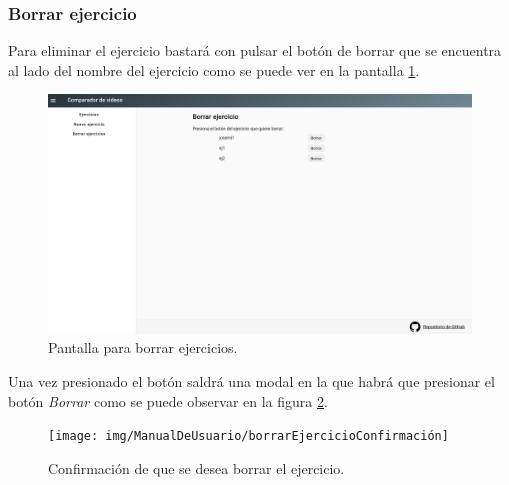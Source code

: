\subsubsection{Borrar ejercicio}
Para eliminar el ejercicio bastará con pulsar el botón de borrar que se encuentra al lado del nombre del ejercicio como se puede ver en la pantalla \ref{fig:borrarejercicio}.
\begin{figure}
	\centering
	\includegraphics[width=0.7\linewidth]{img/ManualDeUsuario/borrarEjercicio}
	\caption{Pantalla para borrar ejercicios.}
	\label{fig:borrarejercicio}
\end{figure}

Una vez presionado el botón saldrá una modal en la que habrá que presionar el botón \textit{Borrar} como se puede observar en la figura \ref{fig:borrarejercicioconfirmacion}.
\begin{figure}
	\centering
	\texttt{[image: img/ManualDeUsuario/borrarEjercicioConfirmación]}
	\caption{Confirmación de que se desea borrar el ejercicio.}
	\label{fig:borrarejercicioconfirmacion}
\end{figure}

